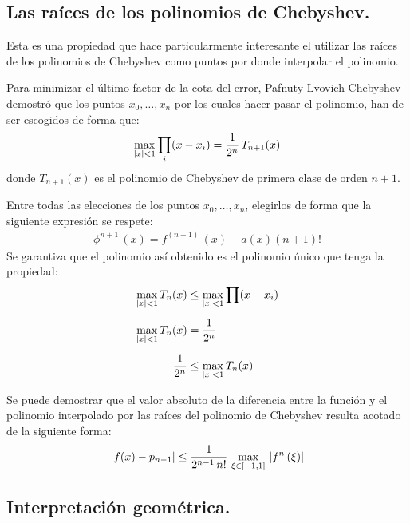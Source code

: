 \documentclass[12pt]{article}
\numberwithin{equation}{section}
\begin{document}
\subsection{Las raíces de los polinomios de Chebyshev.}

Esta es una propiedad que hace particularmente interesante el utilizar las raíces de los polinomios de Chebyshev como puntos por donde interpolar el polinomio.
\par
Para minimizar el último factor de la cota del error, Pafnuty Lvovich Chebyshev demostró que los puntos $x_{0}, \ldots, x_{n}$ por los cuales hacer pasar el polinomio, han de ser escogidos de forma que:
\begin{align*}
\max_{\abs{x} < 1} \prod_{i} (x - x_{i}) = \dfrac{1}{2^{n}} \, T_{n+1} (x)
\end{align*}
donde $T_{n+1}(x)$ es el polinomio de Chebyshev de primera clase de orden $n + 1$.
\par
Entre todas las elecciones de los puntos $x_{0}, \ldots, x_{n}$, elegirlos de forma que la siguiente expresión se respete:
\begin{align*}
\phi^{n+1} \, (x) = f^{(n+1)} \, (\bar{x}) - a (\bar{x}) (n + 1)!
\end{align*}
Se garantiza que el polinomio así obtenido es el polinomio único que tenga la propiedad:
\begin{align*}
\max_{\abs{x} < 1} T_{n} (x) &\leq \max_{\abs{x} < 1} \prod (x - x_{i}) \\[0.5em]
\max_{\abs{x} < 1} T_{n} (x) &= \dfrac{1}{2^{n}} \\[0.5em]
\dfrac{1}{2^{n}} &\leq \max_{\abs{x} < 1} T_{n} (x)
\end{align*}

Se puede demostrar que el valor absoluto de la diferencia entre la función y el polinomio interpolado por las raíces del polinomio de Chebyshev resulta acotado de la siguiente forma:
\begin{align*}
\abs{f(x) - p_{n-1}} \leq \dfrac{1}{2^{n-1} \, n!} \, \max_{\xi \in [-1, 1]}  \, \abs{f^{n} \, (\xi)}
\end{align*}

\subsection{Interpretación geométrica.}
\end{document}
